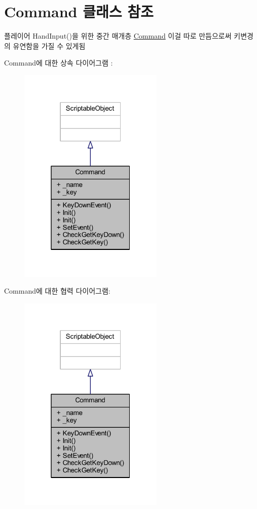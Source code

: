 \hypertarget{class_command}{}\section{Command 클래스 참조}
\label{class_command}


플레이어 Hand\+Input()을 위한 중간 매개층 \mbox{\hyperlink{class_command}{Command}} 이걸 따로 만듬으로써 키변경의 유연함을 가질 수 있게됨  




Command에 대한 상속 다이어그램 \+: 
\nopagebreak
\begin{figure}[H]
\begin{center}
\leavevmode
\includegraphics[width=196pt]{d8/ddd/class_command__inherit__graph}
\end{center}
\end{figure}


Command에 대한 협력 다이어그램\+:
\nopagebreak
\begin{figure}[H]
\begin{center}
\leavevmode
\includegraphics[width=196pt]{db/dd2/class_command__coll__graph}
\end{center}
\end{figure}
